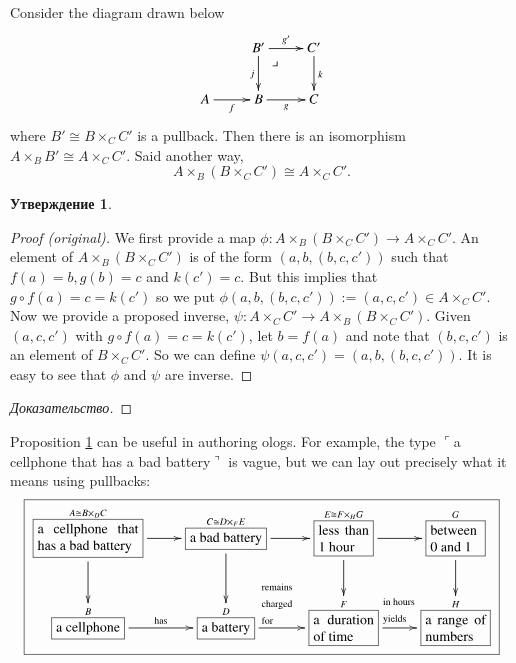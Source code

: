 \documentclass[a4paper]{book}
\makeatletter
\def\tn{\textnormal}
\def\to{\rightarrow}
\def\taking{\colon}
\def\iso{\cong}
\def\rr{\raggedright}
\newcommand{\LA}[2]{\ar[#1]^-{\tn {#2}}}
\newcommand{\obox}[3]{\stackrel{#1}{\fbox{\parbox{#2}{#3}}}}
\newcommand{\smbox}[2]{\stackrel{#1}{\fbox{#2}}}
\newcommand{\fakebox}[1]{\tn{$\ulcorner$#1$\urcorner$}}
\def\ullimit{\ar@{}[rd]|(.3)*+{\lrcorner}}
\theoremstyle{myth}
\newtheorem{propositionENG}[envENG]{\begin{english}Proposition\end{english}}
\newenvironment{proofENG}{\begin{proof}[Proof (original)]}{\end{proof}}
\newtheorem{propositionRUS}[envRUS]{Утверждение}
\newenvironment{proofRUS}{\begin{proof}[Доказательство]}{\end{proof}}
\makeatother
\begin{document}
\begin{russian}
 

\begin{propositionENG}\label{prop:pasting}
Consider the diagram drawn below
$$
\xymatrix{
&B'\ar[r]^{g'}\ar[d]_j\ullimit&C'\ar[d]^k\\
A\ar[r]_f&B\ar[r]_g&C}
$$
where $B'\iso B\times_CC'$ is a pullback. Then there is an isomorphism $A\times_BB'\iso A\times_CC'$. Said another way, $$A\times_B(B\times_CC')\iso A\times_CC'.$$
\end{propositionENG}

\begin{propositionRUS}\label{prop:pasting}
 
\end{propositionRUS}

\begin{proofENG}
We first provide a map $\phi\taking A\times_B(B\times_CC')\to A\times_CC'$. An element of $A\times_B(B\times_CC')$ is of the form $(a,b,(b,c,c'))$ such that $f(a)=b, g(b)=c$ and $k(c')=c$. But this implies that $g\circ f(a)=c=k(c')$ so we put $\phi(a,b,(b,c,c')):=(a,c,c')\in A\times_CC'$. Now we provide a proposed inverse, $\psi\taking A\times_CC'\to A\times_B(B\times_CC')$. Given $(a,c,c')$ with $g\circ f(a)=c=k(c')$, let $b=f(a)$ and note that $(b,c,c')$ is an element of $B\times_CC'$. So we can define $\psi(a,c,c')=(a,b,(b,c,c'))$. It is easy to see that $\phi$ and $\psi$ are inverse.
\end{proofENG}

\begin{proofRUS}
 
\end{proofRUS}

Proposition \ref{prop:pasting} can be useful in authoring ologs. For example, the type \fakebox{a cellphone that has a bad battery} is vague, but we can lay out precisely what it means using pullbacks:
\small
\begin{align}\label{dia:bad battery}
\fbox{\xymatrixnocompile{\obox{A\iso B\times_DC}{1in}{a cellphone that has a bad battery}\ar[r]\ar[d]&\smbox{C\iso D\times_FE}{a bad battery}\ar[r]\ar[d]&\obox{E\iso F\times_HG}{.5in}{less than 1 hour}\ar[r]\ar[d]&\obox{G}{.5in}{between 0 and 1}\ar[d]\\\smbox{B}{a cellphone}\LA{r}{has}&\smbox{D}{a battery}\LA{r}{\parbox{.4in}{\rr remains charged for}}&\obox{F}{.6in}{a duration of time}\LA{r}{\hspace{.07in}\parbox{.4in}{\rr in hours yields}}&\obox{H}{.6in}{a range of numbers}}}
\end{align}\normalsize


\end{russian}
\end{document}
